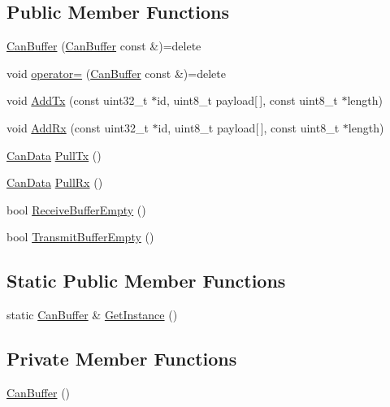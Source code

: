 \subsection*{Public Member Functions}
\begin{DoxyCompactItemize}
\item 
\hyperlink{classCanBuffer_a02b0f8e006051bf73a8a0a70d0e919ec}{Can\+Buffer} (\hyperlink{classCanBuffer}{Can\+Buffer} const \&)=delete
\item 
void \hyperlink{classCanBuffer_aa2a1c35e5a3cf6106d78f986de53911d}{operator=} (\hyperlink{classCanBuffer}{Can\+Buffer} const \&)=delete
\item 
void \hyperlink{classCanBuffer_a9f61d33ebf8b9b98fb30998074351b90}{Add\+Tx} (const uint32\+\_\+t $\ast$id, uint8\+\_\+t payload\mbox{[}$\,$\mbox{]}, const uint8\+\_\+t $\ast$length)
\item 
void \hyperlink{classCanBuffer_a2038c19fd2b63223a86a48a8faef2996}{Add\+Rx} (const uint32\+\_\+t $\ast$id, uint8\+\_\+t payload\mbox{[}$\,$\mbox{]}, const uint8\+\_\+t $\ast$length)
\item 
\hyperlink{can__buffer_8h_a7a5dfa274d7d04c73e0b6b3e4dbbb87c}{Can\+Data} \hyperlink{classCanBuffer_a06cbabdf2a97378a2d4cd9120e909d53}{Pull\+Tx} ()
\item 
\hyperlink{can__buffer_8h_a7a5dfa274d7d04c73e0b6b3e4dbbb87c}{Can\+Data} \hyperlink{classCanBuffer_a66691d3306e47774f768fd391fff1802}{Pull\+Rx} ()
\item 
bool \hyperlink{classCanBuffer_a4b9e4e25a3312729bc64b0a7e7e80abf}{Receive\+Buffer\+Empty} ()
\item 
bool \hyperlink{classCanBuffer_a3826a986a95c4eb24f363a7ace01bec2}{Transmit\+Buffer\+Empty} ()
\end{DoxyCompactItemize}
\subsection*{Static Public Member Functions}
\begin{DoxyCompactItemize}
\item 
static \hyperlink{classCanBuffer}{Can\+Buffer} \& \hyperlink{classCanBuffer_add61873bc4e32e5b79ca665c1926f3b9}{Get\+Instance} ()
\end{DoxyCompactItemize}
\subsection*{Private Member Functions}
\begin{DoxyCompactItemize}
\item 
\hyperlink{classCanBuffer_a48282381b606242cfc4163e445c85409}{Can\+Buffer} ()
\end{DoxyCompactItemize}
